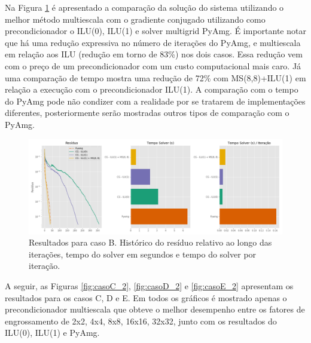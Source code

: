 Na Figura \ref{fig:reservatorio320x320_2} é apresentado a comparação da solução do sistema utilizando o melhor método multiescala com o gradiente conjugado utilizando como precondicionador o ILU(0), ILU(1) e solver multigrid PyAmg. É importante notar que há uma redução expressiva no número de iterações do PyAmg, e multiescala em relação aos ILU (redução em torno de 83\%) nos dois casos. Essa redução vem com o preço de um precondicionador com um custo computacional mais caro. Já uma comparação de tempo mostra uma redução de 72\% com MS(8,8)+ILU(1) em relação a execução com o precondicionador ILU(1). A comparação com o tempo do PyAmg pode não condizer com a realidade por se tratarem de implementações diferentes, posteriormente serão mostradas outros tipos de comparação com o PyAmg.




\begin{figure}[!htbp]
\centering
\includegraphics[width=\textwidth]{chap08/figs/reservatorio320x320_2.png}
\caption{Resultados para caso B. Histórico do resíduo relativo ao longo das iterações, tempo do solver em segundos e tempo do solver por iteração. }
\label{fig:reservatorio320x320_2}
\end{figure}

\FloatBarrier

A seguir, as Figuras \ref{fig:casoC_2}, \ref{fig:casoD_2} e \ref{fig:casoE_2} apresentam os resultados para os casos C, D e E. 
Em todos os gráficos é mostrado apenas o precondicionador multiescala que obteve o melhor desempenho entre os fatores de engrossamento de 2x2, 4x4, 8x8, 16x16, 32x32,  junto com os resultados do ILU(0), ILU(1) e PyAmg.




